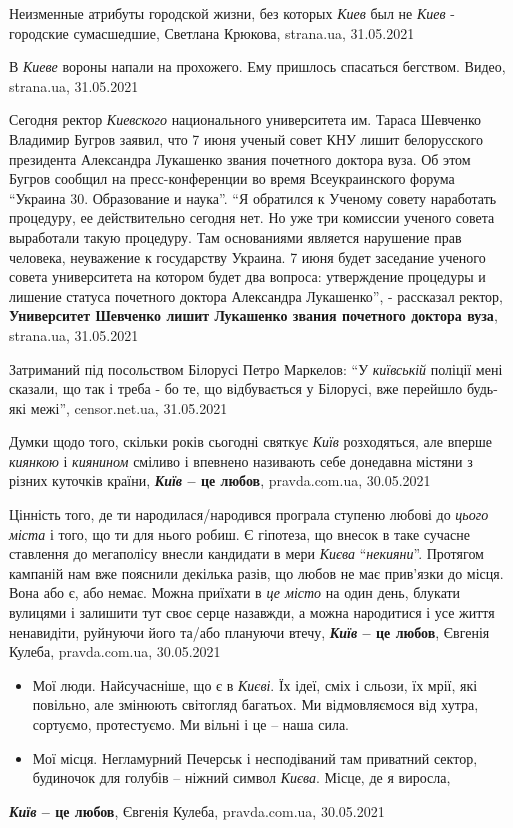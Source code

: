 Неизменные атрибуты городской жизни, без которых \emph{Киев} был не \emph{Киев}
- городские сумасшедшие, Светлана Крюкова, strana.ua, 31.05.2021

В \emph{Киеве} вороны напали на прохожего. Ему пришлось спасаться бегством.
Видео, strana.ua, 31.05.2021

Сегодня ректор \emph{Киевского} национального университета им. Тараса Шевченко
Владимир Бугров заявил, что 7 июня ученый совет КНУ лишит белорусского
президента Александра Лукашенко звания почетного доктора вуза.  Об этом Бугров
сообщил на пресс-конференции во время Всеукраинского форума \enquote{Украина
30.  Образование и наука}. \enquote{Я обратился к Ученому совету наработать
процедуру, ее действительно сегодня нет. Но уже три комиссии ученого совета
выработали такую процедуру. Там основаниями является нарушение прав человека,
неуважение к государству Украина. 7 июня будет заседание ученого совета
университета на котором будет два вопроса: утверждение процедуры и лишение
статуса почетного доктора Александра Лукашенко}, - рассказал ректор,
\textbf{Университет Шевченко лишит Лукашенко звания почетного доктора вуза},
strana.ua, 31.05.2021

Затриманий під посольством Білорусі Петро Маркелов: \enquote{У \emph{київській} поліції мені
сказали, що так і треба - бо те, що відбувається у Білорусі, вже перейшло
будь-які межі}, censor.net.ua, 31.05.2021


Думки щодо того, скільки років сьогодні святкує \emph{Київ} розходяться, але
вперше \emph{киянкою} і \emph{киянином} сміливо і впевнено називають себе донедавна містяни з
різних куточків країни, 
\textbf{\emph{Київ} – це любов}, pravda.com.ua, 30.05.2021

Цінність того, де ти народилася/народився програла ступеню любові до \emph{цього
міста} і того, що ти для нього робиш. Є гіпотеза, що внесок в таке сучасне
ставлення до мегаполісу внесли кандидати в мери \emph{Києва} \enquote{\emph{некияни}}. Протягом
кампаній нам вже пояснили декілька разів, що любов не має прив'язки до місця.
Вона або є, або немає.  Можна приїхати в \emph{це місто} на один день, блукати
вулицями і залишити тут своє серце назавжди, а можна народитися і усе життя
ненавидіти, руйнуючи його та/або плануючи втечу,
\textbf{\emph{Київ} – це любов}, Євгенія Кулеба, pravda.com.ua, 30.05.2021

\begin{itemize}
\item Мої люди.  Найсучасніше, що є в \emph{Києві}. Їх ідеї, сміх і сльози, їх мрії, які
повільно, але змінюють світогляд багатьох. Ми відмовляємося від хутра,
сортуємо, протестуємо. Ми вільні і це – наша сила.
\item Мої місця. Негламурний Печерськ і несподіваний там приватний сектор, будиночок
для голубів – ніжний символ \emph{Києва}. Місце, де я виросла,
\end{itemize}
\textbf{\emph{Київ} – це любов}, Євгенія Кулеба, pravda.com.ua, 30.05.2021


